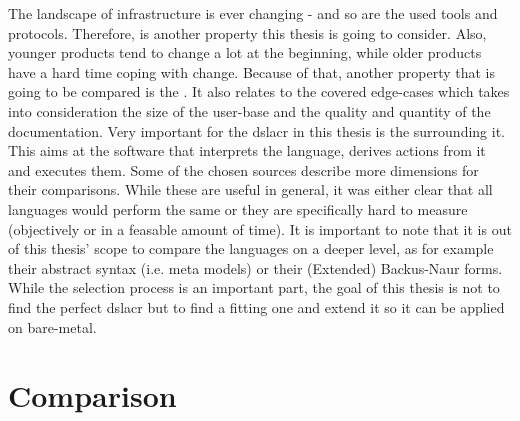 
The landscape of infrastructure is ever changing - and so are the used tools and protocols. Therefore,  is another property this thesis is going to consider.
\newline
Also, younger products tend to change a lot at the beginning, while older products have a hard time coping with change. Because of that, another property that is going to be compared is the . It also relates to the covered edge-cases which takes into consideration the size of the user-base and the quality and quantity of the documentation.
\newline
Very important for the \gls{dslacr} in this thesis is the  surrounding it. This aims at the software that interprets the language, derives actions from it and executes them.
\newline
Some of the chosen sources describe more dimensions for their comparisons. While these are useful in general, it was either clear that all languages would perform the same or they are specifically hard to measure (objectively or in a feasable amount of time). %
\newline
It is important to note that it is out of this thesis' scope to compare the languages on a deeper level, as for example their abstract syntax (i.e. meta models) or their (Extended) Backus-Naur forms. While the selection process is an important part, the goal of this thesis is not to find the perfect \gls{dslacr} but to find a fitting one and extend it so it can be applied on bare-metal.


\section{Comparison} %

